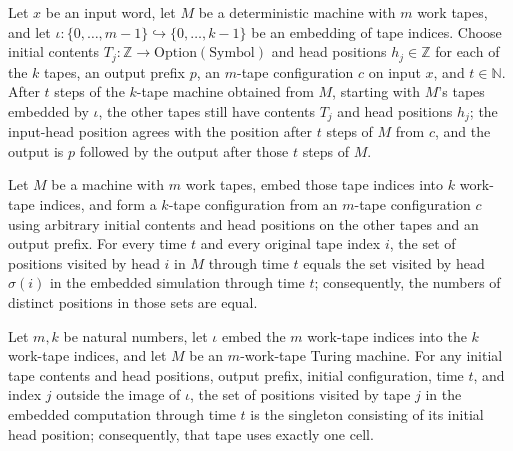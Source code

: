 \begin{theorem}
\label{Turing.embedEmitTM_frame}
\leanok
{}
Let $x$ be an input word, let $M$ be a deterministic machine with $m$ work tapes, and
let $\iota : \{0,\ldots,m-1\} \hookrightarrow \{0,\ldots,k-1\}$ be an embedding of tape
indices. Choose initial contents $T_j : \mathbb{Z} \to \mathrm{Option}(\mathrm{Symbol})$
and head positions $h_j \in \mathbb{Z}$ for each of the $k$ tapes, an output prefix $p$,
an $m$-tape configuration $c$ on input $x$, and $t \in \mathbb{N}$. After $t$ steps of
the $k$-tape machine obtained from $M$, starting with $M$'s tapes embedded by $\iota$,
the other tapes still have contents $T_j$ and head positions $h_j$; the input-head
position agrees with the position after $t$ steps of $M$ from $c$, and the output is $p$
followed by the output after those $t$ steps of $M$.
\end{theorem}

\begin{theorem}
\label{Turing.embedEmitTM_visitedByTapeHead}
\leanok
{}
Let $M$ be a machine with $m$ work tapes, embed those tape indices into $k$ work-tape
indices, and form a $k$-tape configuration from an $m$-tape configuration $c$ using
arbitrary initial contents and head positions on the other tapes and an output prefix.
For every time $t$ and every original tape index $i$, the set of positions visited by
head $i$ in $M$ through time $t$ equals the set visited by head $\sigma(i)$ in the
embedded simulation through time $t$; consequently, the numbers of distinct positions in
those sets are equal.
\end{theorem}

\begin{theorem}
\label{Turing.embedEmitTM_visitedByTapeHead_frame}
\leanok
{}
Let $m,k$ be natural numbers, let $\iota$ embed the $m$ work-tape indices into the $k$
work-tape indices, and let $M$ be an $m$-work-tape Turing machine. For any initial tape
contents and head positions, output prefix, initial configuration, time $t$, and index
$j$ outside the image of $\iota$, the set of positions visited by tape $j$ in the
embedded computation through time $t$ is the singleton consisting of its initial head
position; consequently, that tape uses exactly one cell.
\end{theorem}

